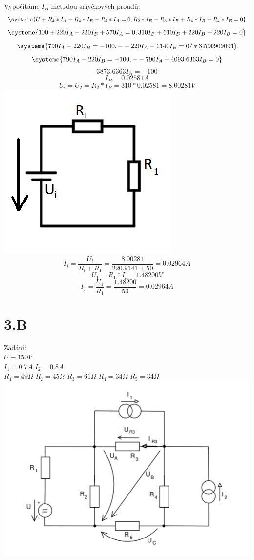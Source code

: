 \documentclass[11pt]{article}
\begin{document}
Vypočítáme $I_B$ metodou smyčkových proudů:\\
\begin{equation*}
  \systeme{
  U + R_4*I_A - R_4 * I_B + R_5 * I_A  = 0,
  R_2 * I_B + R_3 * I_B + R_4 * I_B - R_4 * I_B = 0
  }
\end{equation*}
\begin{equation*}
  \systeme{
  100 + 220I_A - 220I_B + 570I_A  = 0,
  310I_B + 610I_B + 220I_B - 220I_B = 0
  }
\end{equation*}
\begin{equation*}
  \systeme{
  790I_A - 220I_B  = -100,
  - -220I_A + 1140I_B = 0 / * 3.590909091
  }
\end{equation*}
\begin{equation*}
  \systeme{
  790I_A - 220I_B  = -100,
  - -790I_A + 4093.6363I_B = 0
  }
\end{equation*}
$$3873.6363I_B = - 100$$
$$I_B = 0.02581A$$
$$U_i = U_2 = R_2 * I_B = 310 * 0.02581 = 8.00281V $$
\includegraphics[width=0.7\linewidth]{priklad2_nahrazeni.png}\\
$$I_i = \frac{U_i}{R_i + R_1} = \frac{8.00281}{220.9141 + 50} = 0.02964A$$
$$U_1 = R_1 * I_i = 1.48200V$$
$$I_1 = \frac{U_1}{R_1} = \frac{1.48200}{50} = 0.02964A$$
\section*{3.B}
Zadání:\\
$U = 150V$\\
$I_1 = 0.7A$
$I_2 = 0.8A$\\
$R_1 = 49\Omega$
$R_2 = 45\Omega$
$R_3 = 61\Omega$
$R_4 = 34\Omega$
$R_5 = 34\Omega$\\
\includegraphics[width=1\linewidth]{priklad3_zadani.png}\\
\end{document}
